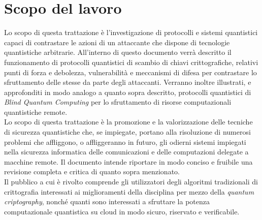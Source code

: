 

\section{Scopo del lavoro}
Lo scopo di questa trattazione è l'investigazione di protocolli e sistemi quantistici capaci di contrastare le azioni di un attaccante che dispone di tecnologie quantistiche arbitrarie. All'interno di questo documento verrà descritto il funzionamento di protocolli quantistici di scambio di chiavi crittografiche, relativi punti di forza e debolezza, vulnerabilità e meccanismi di difesa per contrastare lo sfruttamento delle stesse da parte degli attaccanti. Verranno inoltre illustrati, e approfonditi in modo analogo a quanto sopra descritto, protocolli quantistici di \textit{Blind Quantum Computing} per lo sfruttamento di risorse computazionali quantistiche remote.\\

Lo scopo di questa trattazione è la promozione e la valorizzazione delle tecniche di sicurezza quantistiche che, se impiegate, portano alla risoluzione di numerosi problemi che affliggono, o affliggeranno in futuro, gli odierni sistemi impiegati nella sicurezza informatica delle comunicazioni e delle computazioni delegate a macchine remote. Il documento intende riportare in modo conciso e fruibile una revisione completa e critica di quanto sopra menzionato. \\
Il pubblico a cui è rivolto comprende gli utilizzatori degli algoritmi tradizionali di crittografia interessati ai miglioramenti della disciplina per mezzo della \textit{quantum criptography}, nonché quanti sono interessati a sfruttare la potenza computazionale quantistica su cloud in modo sicuro, riservato e verificabile.\\


